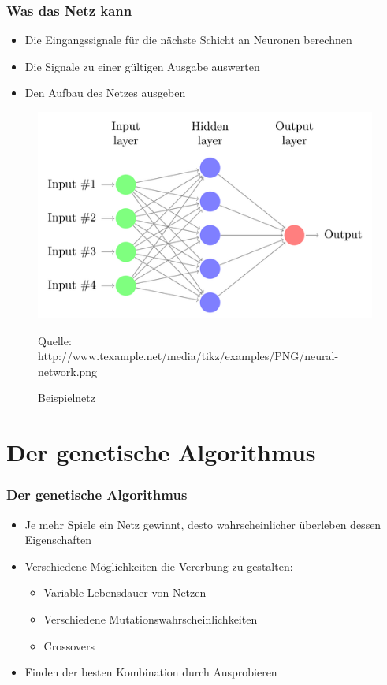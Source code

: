 \documentclass[compress]{beamer}
\begin{document}
\begin{frame}
	\frametitle{Was das Netz kann}
	
	\begin{itemize}
		\item Die Eingangssignale für die nächste Schicht an Neuronen berechnen
		\item Die Signale zu einer gültigen Ausgabe auswerten
		\item Den Aufbau des Netzes ausgeben
	\end{itemize}
	
	\begin{figure}
		\begin{center}
			\includegraphics[scale=0.25]{net.png}
		\end{center}
		\caption{Beispielnetz}
		\begin{footnotesize}
		Quelle: http://www.texample.net/media/tikz/examples/PNG/neural-network.png
		\end{footnotesize}
		\label{fig:Netz}
	\end{figure}
	
\end{frame}

\section{Der genetische Algorithmus}
\begin{frame}
	\frametitle{Der genetische Algorithmus}

	\begin{itemize}
		\item Je mehr Spiele ein Netz gewinnt, desto wahrscheinlicher überleben dessen Eigenschaften
		\item Verschiedene Möglichkeiten die Vererbung zu gestalten:

		\begin{itemize}
			\item Variable Lebensdauer von Netzen
			\item Verschiedene Mutationswahrscheinlichkeiten
			\item Crossovers
		\end{itemize}
		
		\item Finden der besten Kombination durch Ausprobieren
	\end{itemize}
\end{frame}
\end{document}
